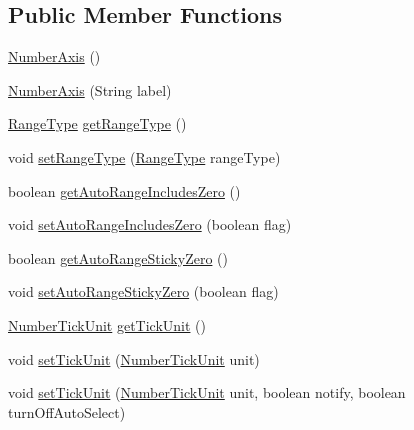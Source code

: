 \subsection*{Public Member Functions}
\begin{DoxyCompactItemize}
\item 
\mbox{\hyperlink{classorg_1_1jfree_1_1chart_1_1axis_1_1_number_axis_a1c4bca834e0f0bf26802bd88690fca17}{Number\+Axis}} ()
\item 
\mbox{\hyperlink{classorg_1_1jfree_1_1chart_1_1axis_1_1_number_axis_a318db4480cecc7359647e2978dbadc9d}{Number\+Axis}} (String label)
\item 
\mbox{\hyperlink{classorg_1_1jfree_1_1data_1_1_range_type}{Range\+Type}} \mbox{\hyperlink{classorg_1_1jfree_1_1chart_1_1axis_1_1_number_axis_a94094757ebaf3ace59f591e033da1144}{get\+Range\+Type}} ()
\item 
void \mbox{\hyperlink{classorg_1_1jfree_1_1chart_1_1axis_1_1_number_axis_a6636f7ceef2cafa5230d718b195e96d1}{set\+Range\+Type}} (\mbox{\hyperlink{classorg_1_1jfree_1_1data_1_1_range_type}{Range\+Type}} range\+Type)
\item 
boolean \mbox{\hyperlink{classorg_1_1jfree_1_1chart_1_1axis_1_1_number_axis_a503dd4fb3ddf5fc3a1379e3bcec78d27}{get\+Auto\+Range\+Includes\+Zero}} ()
\item 
void \mbox{\hyperlink{classorg_1_1jfree_1_1chart_1_1axis_1_1_number_axis_ac9662f9ecf18946f778833bfcc2e7d7c}{set\+Auto\+Range\+Includes\+Zero}} (boolean flag)
\item 
boolean \mbox{\hyperlink{classorg_1_1jfree_1_1chart_1_1axis_1_1_number_axis_a9562391142ac5e377c87a8a10614c092}{get\+Auto\+Range\+Sticky\+Zero}} ()
\item 
void \mbox{\hyperlink{classorg_1_1jfree_1_1chart_1_1axis_1_1_number_axis_a1967bd80607d8499457992833745789f}{set\+Auto\+Range\+Sticky\+Zero}} (boolean flag)
\item 
\mbox{\hyperlink{classorg_1_1jfree_1_1chart_1_1axis_1_1_number_tick_unit}{Number\+Tick\+Unit}} \mbox{\hyperlink{classorg_1_1jfree_1_1chart_1_1axis_1_1_number_axis_a17a75a59f3d3b8eff0d53c717bfb3b13}{get\+Tick\+Unit}} ()
\item 
void \mbox{\hyperlink{classorg_1_1jfree_1_1chart_1_1axis_1_1_number_axis_a0990c55ae7683e249177ce3382ddc2e3}{set\+Tick\+Unit}} (\mbox{\hyperlink{classorg_1_1jfree_1_1chart_1_1axis_1_1_number_tick_unit}{Number\+Tick\+Unit}} unit)
\item 
void \mbox{\hyperlink{classorg_1_1jfree_1_1chart_1_1axis_1_1_number_axis_aec957791ea678580712a475bc75ea65d}{set\+Tick\+Unit}} (\mbox{\hyperlink{classorg_1_1jfree_1_1chart_1_1axis_1_1_number_tick_unit}{Number\+Tick\+Unit}} unit, boolean notify, boolean turn\+Off\+Auto\+Select)

\end{DoxyCompactItemize}
